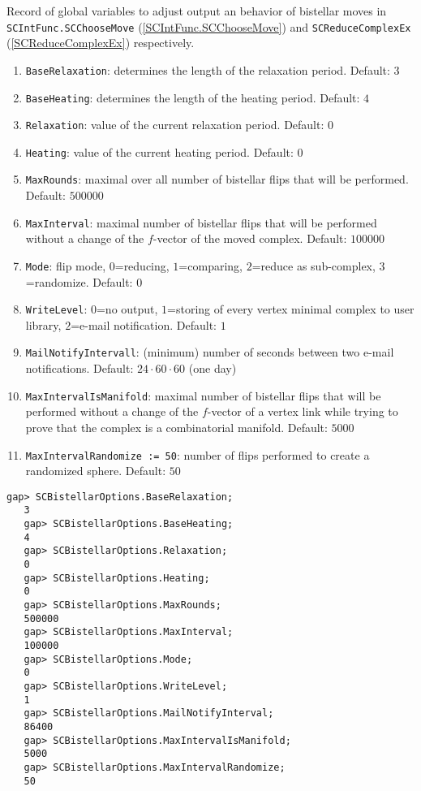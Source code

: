\documentclass[a4paper,11pt]{report}
\begin{document}
{{{ Record of global variables to adjust output an behavior of bistellar moves in \texttt{SCIntFunc.SCChooseMove} (\ref{SCIntFunc.SCChooseMove}) and \texttt{SCReduceComplexEx} (\ref{SCReduceComplexEx}) respectively. 
\begin{enumerate}
\item \texttt{BaseRelaxation}: determines the length of the relaxation period. Default: $3$
\item \texttt{BaseHeating}: determines the length of the heating period. Default: $4$
\item \texttt{Relaxation}: value of the current relaxation period. Default: $0$
\item \texttt{Heating}: value of the current heating period. Default: $0$
\item \texttt{MaxRounds}: maximal over all number of bistellar flips that will be performed. Default: $500000$
\item \texttt{MaxInterval}: maximal number of bistellar flips that will be performed without a change of
the $f$-vector of the moved complex. Default: $100000$
\item \texttt{Mode}: flip mode, $0$=reducing, $1$=comparing, $2$=reduce as sub-complex, $3$=randomize. Default: $0$ 
\item \texttt{WriteLevel}: $0$=no output, $1$=storing of every vertex minimal complex to user library, $2$=e-mail notification. Default: $1$ 
\item \texttt{MailNotifyIntervall}: (minimum) number of seconds between two e-mail notifications. Default: $24 \cdot 60 \cdot 60$ (one day)
\item \texttt{MaxIntervalIsManifold}: maximal number of bistellar flips that will be performed without a change of
the $f$-vector of a vertex link while trying to prove that the complex is a
combinatorial manifold. Default: $5000$
\item \texttt{MaxIntervalRandomize := 50}: number of flips performed to create a randomized sphere. Default: $50$
\end{enumerate}
 
\begin{Verbatim}[commandchars=!@|,fontsize=\small,frame=single,label=Example]
   gap> SCBistellarOptions.BaseRelaxation;
   3
   gap> SCBistellarOptions.BaseHeating;
   4
   gap> SCBistellarOptions.Relaxation;
   0
   gap> SCBistellarOptions.Heating;
   0
   gap> SCBistellarOptions.MaxRounds;
   500000
   gap> SCBistellarOptions.MaxInterval;
   100000
   gap> SCBistellarOptions.Mode;
   0
   gap> SCBistellarOptions.WriteLevel;
   1
   gap> SCBistellarOptions.MailNotifyInterval;
   86400
   gap> SCBistellarOptions.MaxIntervalIsManifold;
   5000
   gap> SCBistellarOptions.MaxIntervalRandomize;
   50
   

\end{Verbatim}}}}
\end{document}
